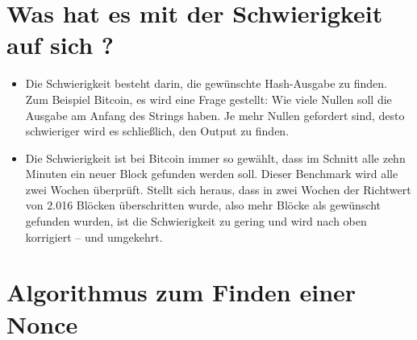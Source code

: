 \documentclass[ngerman]{scrreprt}
\begin{document}
\section{Was hat es mit der Schwierigkeit auf sich ?}
\begin{itemize}
\item{Die Schwierigkeit besteht darin, die gewünschte Hash-Ausgabe zu finden. Zum Beispiel Bitcoin, es wird eine Frage gestellt: Wie viele Nullen soll die Ausgabe am Anfang des Strings haben. Je mehr Nullen gefordert sind, desto schwieriger wird es schließlich, den Output zu finden. \cite{btc-echo-proof-of-work}}
\item{Die Schwierigkeit ist bei Bitcoin immer so gewählt, dass im Schnitt alle zehn Minuten ein neuer Block gefunden werden soll. Dieser Benchmark wird alle zwei Wochen überprüft. Stellt sich heraus, dass in zwei Wochen der Richtwert von 2.016 Blöcken überschritten wurde, also mehr Blöcke als gewünscht gefunden wurden, ist die Schwierigkeit zu gering und wird nach oben korrigiert – und umgekehrt. \cite{btc-echo-proof-of-work}}
\end{itemize}

\section{Algorithmus zum Finden einer Nonce}
	
\end{document}
